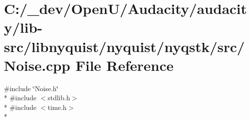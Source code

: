 \hypertarget{lib-src_2libnyquist_2nyquist_2nyqstk_2src_2_noise_8cpp}{}\section{C\+:/\+\_\+dev/\+Open\+U/\+Audacity/audacity/lib-\/src/libnyquist/nyquist/nyqstk/src/\+Noise.cpp File Reference}
\label{lib-src_2libnyquist_2nyquist_2nyqstk_2src_2_noise_8cpp}
{\ttfamily \#include \char`\"{}Noise.\+h\char`\"{}}\\*
{\ttfamily \#include $<$stdlib.\+h$>$}\\*
{\ttfamily \#include $<$time.\+h$>$}\\*
